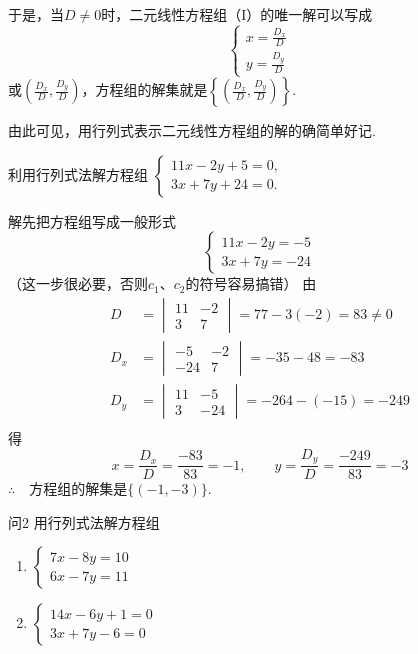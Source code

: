 于是，当$D\ne 0$时，二元线性方程组（I）的唯一解可以写成
\begin{equation}
  \begin{cases}
    x=\frac{D_x}{D}\\[1ex]
   y=\frac{D_y}{D}
  \end{cases}\tag{9}
\end{equation}
或$\left(\frac{D_x}{D},\frac{D_y}{D}\right)$，方程组的解集就是$\left\{\left(\frac{D_x}{D},\frac{D_y}{D}\right)\right\}$.

由此可见，用行列式表示二元线性方程组的解的确简单好记.

\begin{example}
  利用行列式法解方程组
$\begin{cases}
  11x-2y+5=0,\\3x+7y+24=0.
\end{cases}  $
\end{example}

\begin{solution}
  解先把方程组写成一般形式
\[\begin{cases}
  11x-2y=-5 \\ 3x+7y=-24
\end{cases}\]
（这一步很必要，否则$c_1$、$c_2$的符号容易搞错）
由
\[\begin{split}
  D&=\begin{vmatrix}
    11&-2\\3&7
  \end{vmatrix}=77-3(-2)=83\ne 0\\
  D_x&=\begin{vmatrix}
    -5&-2\\-24&7
  \end{vmatrix}=-35-48=-83\\
  D_y&=\begin{vmatrix}
    11&-5\\3&-24
  \end{vmatrix}=-264-(-15)=-249\\
\end{split}\]
得
\[x=\frac{D_x}{D}=\frac{-83}{83}=-1,\qquad y=\frac{D_y}{D}=\frac{-249}{83}=-3\]
$\therefore\quad $方程组的解集是$\{(-1,-3)\}$.
\end{solution}

\begin{thm}{问2}
  用行列式法解方程组
\begin{multicols}{2}
\begin{enumerate}[(1)]
  \item $\begin{cases}
    7x-8y=10\\6x-7y=11
  \end{cases}$
  \item $\begin{cases}
    14x-6y+1=0\\
    3x+7y-6=0
  \end{cases}$
\end{enumerate}
\end{multicols}
\end{thm}

